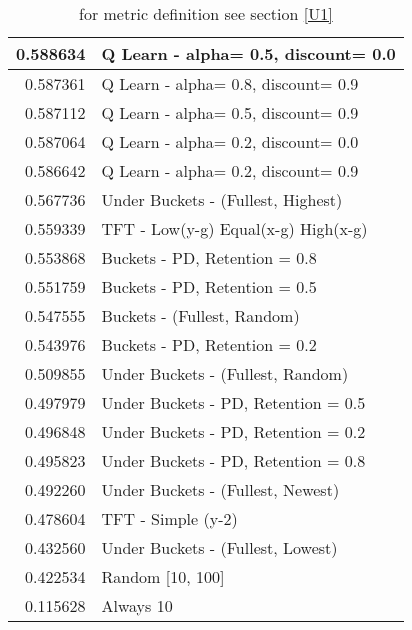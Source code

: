 \begin{table}[!hbtp]
\begin{footnotesize}
\begin{tabular}{|r|l|}
0.588634 & Q Learn - alpha= 0.5, discount= 0.0\\ \hline
0.587361 & Q Learn - alpha= 0.8, discount= 0.9\\ \hline
0.587112 & Q Learn - alpha= 0.5, discount= 0.9\\ \hline
0.587064 & Q Learn - alpha= 0.2, discount= 0.0\\ \hline
0.586642 & Q Learn - alpha= 0.2, discount= 0.9\\ \hline
0.567736 & Under Buckets - (Fullest, Highest)\\ \hline
0.559339 & TFT - Low(y-g) Equal(x-g) High(x-g)\\ \hline
0.553868 & Buckets - PD, Retention = 0.8\\ \hline
0.551759 & Buckets - PD, Retention = 0.5\\ \hline
0.547555 & Buckets - (Fullest, Random)\\ \hline
0.543976 & Buckets - PD, Retention = 0.2\\ \hline
0.509855 & Under Buckets - (Fullest, Random)\\ \hline
0.497979 & Under Buckets - PD, Retention = 0.5\\ \hline
0.496848 & Under Buckets - PD, Retention = 0.2\\ \hline
0.495823 & Under Buckets - PD, Retention = 0.8\\ \hline
0.492260 & Under Buckets - (Fullest, Newest)\\ \hline
0.478604 & TFT - Simple (y-2)\\ \hline
0.432560 & Under Buckets - (Fullest, Lowest)\\ \hline
0.422534 & Random [10, 100]\\ \hline
0.115628 & Always 10\\ \hline
\end{tabular}
\caption{for metric definition see section \eqref{U1}}
\end{footnotesize}
\end{table}

